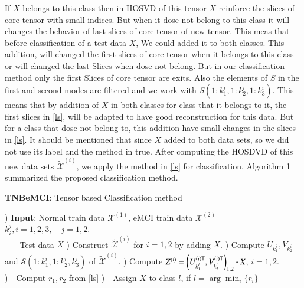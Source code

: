 \documentclass[preprint,12pt]{elsarticle}
\begin{document}
If $X$ belongs to this class then in HOSVD of this tensor $X$ reinforce the slices of core tensor with small indices. But when it  dose not belong to this class  it  will changes the behavior of last slices of core tensor of new tensor. This meas that before classification of a test data $X$, We could added it to both classes. This addition,  will changed the first slices of core tensor when it belongs to this  class or
will changed the last Slices  when dose not belong. But in our classification method only the first Slices of core tensor are exits. Also the elements of $S$ in the first and second modes are filtered and we work with $S(1:k_1^i,1:k_2^i,1:k_3^i)$.  This means that by addition of $X$ in both classes for class that it belongs to it, the first slices in \eqref{ls}, will be  adapted to have good reconstruction for this data. But for a class that dose not belong to, this addition have small changes in the slices in \eqref{ls}.
It should be mentioned that
since $X$ added to both data sets, so we did not use its label and the method in true. After computing the HOSDVD of this new data sets $\widetilde{\mathcal{X}}^{(i)}$, we apply the method in \eqref{ls} for classification.  Algorithm 1 summarized the proposed classification method.
\begin{algorithm}[h!]
	\label{ATNB}
	\caption{\textbf{TNBeMCI}: Tensor based Classification method}
	\begin{algorithmic}
		) \textbf{Input}: Normal train data $\mathcal{X}^{(1)}$, eMCI train data $\mathcal{X}^{(2)}$
		\STATE~~~    $k_i^j, i=1,2,3, \quad j=1,2$.\\
		\STATE~~~ Test data $X$
		) Construct $\widetilde{\mathcal{X}}^{(i)}$ for $i=1,2$ by adding $X$.
		) Compute $U_{k_1^i}, V_{k_2^i}$ and $\mathcal{S}(1:k_1^i,1:k_2^i,k_3^i)$ of  $\widetilde{\mathcal{X}}^{(i)}$.
		) Compute $Z^{(i)} = \left( U_{k_1^i}^{(i)\sf T}, V_{k_2^i}^{(i)\sf T} 
		\right)_{1,2}\boldsymbol{\cdot} X$, $i=1,2.$
		)~~Comput $r_1,r_2$ from \eqref{ls}
		 )~~Assign $X$ to class $l$, if $l= \arg \min_{i} \{r_i\}$
	\end{algorithmic}
\end{algorithm}
\end{document}
